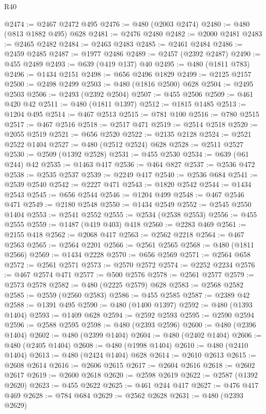 \begin{lexlean}{R40}
\begin{coremodule}
@2474 := @2467 @2472 @495
@2476 := @480 (@2003 @2474)
@2480 := @480 (@813 @1882 @495) @628
@2481 := @2476 @2480
@2482 := @2000 @2481
@2483 := @2465 @2482
@2484 := @2463 @2483
@2485 := @2461 @2484
@2486 := @2459 @2485
@2487 := @1977 @2486
@2489 := @2457 (@2392 @2487)
@2490 := @455 @2489
@2493 := @639 (@419 @137) @40
@2495 := @480 (@1811 @783)
@2496 := @1434 @2151
@2498 := @656 @2496 @1829
@2499 := @2125 @2157
@2500 := @2498 @2499
@2503 := @480 (@1816 @2500) @628
@2504 := @2495 @2503
@2506 := @2493 (@2392 @2504)
@2507 := @455 @2506
@2509 := @461 @420 @42
@2511 := @480 (@1811 @1397)
@2512 := @1815 @1485
@2513 := @1204 @495
@2514 := @467 @2513
@2515 := @781 @100
@2516 := @780 @2515
@2517 := @467 @2516
@2518 := @2517 @471
@2519 := @2514 @2518
@2520 := @2055 @2519
@2521 := @656 @2520
@2522 := @2135 @2128
@2524 := @2521 @2522 @1404
@2527 := @480 (@2512 @2524) @628
@2528 := @2511 @2527
@2530 := @2509 (@1392 @2528)
@2531 := @455 @2530
@2534 := @639 (@61 @244) @42
@2535 := @1463 @417
@2536 := @464 @827
@2537 := @2536 @472
@2538 := @2535 @2537
@2539 := @2249 @417
@2540 := @2536 @684
@2541 := @2539 @2540
@2542 := @2227 @471
@2543 := @1820 @2542
@2544 := @1434 @2543
@2545 := @656 @2544
@2546 := @1204 @499
@2548 := @467 @2546 @471
@2549 := @2180 @2548
@2550 := @1434 @2549
@2552 := @2545 @2550 @1404
@2553 := @2541 @2552
@2555 := @2534 (@2538 @2553)
@2556 := @455 @2555
@2559 := @1487 (@419 @403) @418
@2560 := @2283 @469
@2561 := @2155 @418
@2562 := @2068 @417
@2563 := @2562 @2218
@2564 := @467 @2563
@2565 := @2564 @2201
@2566 := @2561 @2565
@2568 := @480 (@1811 @2566)
@2569 := @1434 @2228
@2570 := @656 @2569
@2571 := @2564 @658
@2572 := @2561 @2571
@2573 := @2570 @2572
@2574 := @2252 @2234
@2576 := @467 @2574 @471
@2577 := @500 @2576
@2578 := @2561 @2577
@2579 := @2573 @2578
@2582 := @480 (@2225 @2579) @628
@2583 := @2568 @2582
@2585 := @2559 (@2560 @2583)
@2586 := @455 @2585
@2587 := @2389 @42
@2588 := @1391 @495
@2590 := @480 (@1400 @1397)
@2592 := @480 (@1393 @1404)
@2593 := @1409 @628
@2594 := @2592 @2593
@2595 := @2590 @2594
@2596 := @2588 @2595
@2598 := @480 (@2393 @2596)
@2600 := @480 (@2396 @1404)
@2602 := @480 (@2399 @1404)
@2604 := @480 (@2402 @1404)
@2606 := @480 (@2405 @1404)
@2608 := @480 (@1998 @1404)
@2610 := @480 (@2410 @1404)
@2613 := @480 (@2424 @1404) @628
@2614 := @2610 @2613
@2615 := @2608 @2614
@2616 := @2606 @2615
@2617 := @2604 @2616
@2618 := @2602 @2617
@2619 := @2600 @2618
@2620 := @2598 @2619
@2622 := @2587 (@1392 @2620)
@2623 := @455 @2622
@2625 := @461 @244 @417
@2627 := @476 @417 @469
@2628 := @784 @684
@2629 := @2562 @2628
@2631 := @480 (@2393 @2629)

\end{coremodule}
\end{lexlean}
